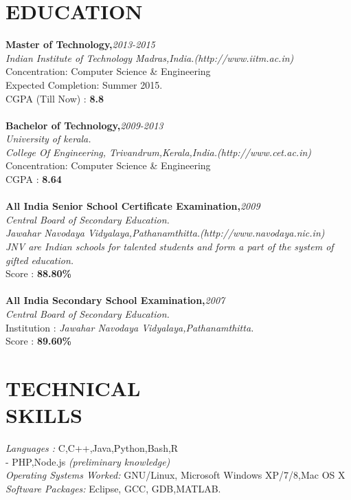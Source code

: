 \documentclass[line,margin]{res}
\begin{document}
\begin{resume}
  \section{EDUCATION}
  \textbf{ Master of Technology,}\hfill \textit{2013-2015}\\
  \textit{Indian Institute of Technology Madras,India.\hfill(http://www.iitm.ac.in)} \\
  Concentration: Computer Science \& Engineering \\
  Expected Completion: Summer 2015.\\
  CGPA (Till Now) : \textbf{ 8.8} \\\\
  \textbf{ Bachelor of Technology,}\hfill \textit{2009-2013}\\
  \textit{University of kerala.}\\
  \textit{College Of Engineering, Trivandrum,Kerala,India.\hfill(http://www.cet.ac.in)} \\
  Concentration: Computer Science \& Engineering \\
  CGPA : \textbf{ 8.64} \\\\
  \textbf{ All India Senior School Certificate Examination,}\hfill \textit{2009}\\
  \textit{Central Board of Secondary Education.}\\
  \textit{Jawahar Navodaya Vidyalaya,Pathanamthitta.}\hfill{\it(http://www.navodaya.nic.in)}\\
  \textit{JNV are Indian schools for talented students and form a part of the system of gifted education.}\\
  Score       : \textbf{ 88.80\% } \\\\
  \textbf{ All India Secondary School Examination,}\hfill \textit{2007}\\
  \textit{Central Board of Secondary Education.}\\
  Institution : \textit{Jawahar Navodaya Vidyalaya,Pathanamthitta.} \\
  Score       : \textbf{ 89.60\% } \\

  \section{TECHNICAL \\ SKILLS}
  \textit{Languages :} C,C++,Java,Python,Bash,R\\
  -\hspace{15 mm} PHP,Node.js \textit{(preliminary knowledge)}\\
  \textit{Operating Systems Worked:} GNU/Linux, Microsoft Windows XP/7/8,Mac OS X\\
  \textit{Software Packages:} Eclipse, GCC, GDB,MATLAB.\\

\end{resume}
\end{document}
